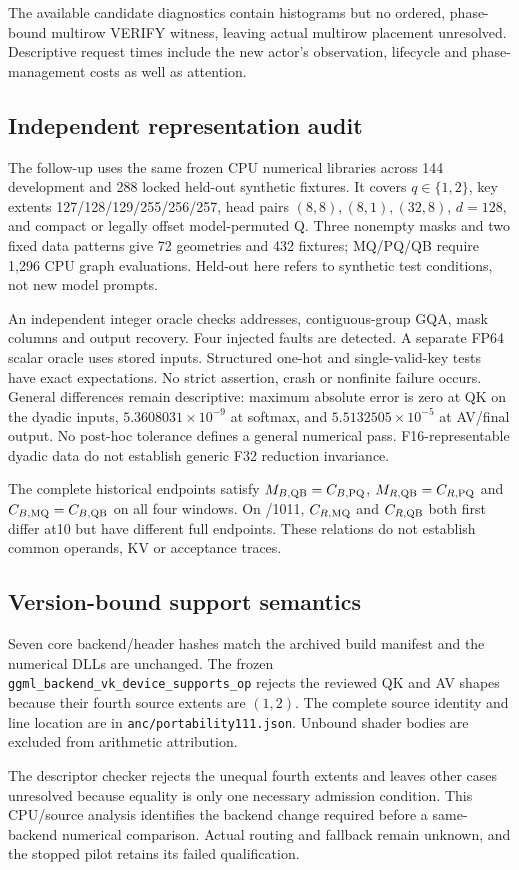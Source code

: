 The available candidate diagnostics contain histograms but no ordered, phase-bound multirow VERIFY witness, leaving actual multirow placement unresolved. Descriptive request times include the new actor's observation, lifecycle and phase-management costs as well as attention.

\subsection{Independent representation audit}
The follow-up uses the same frozen CPU numerical libraries across 144 development and 288 locked held-out synthetic fixtures. It covers $q\in\{1,2\}$, key extents 127/128/129/255/256/257, head pairs $(8,8),(8,1),(32,8)$, $d=128$, and compact or legally offset model-permuted Q. Three nonempty masks and two fixed data patterns give 72 geometries and 432 fixtures; MQ/PQ/QB require 1,296 CPU graph evaluations. Held-out here refers to synthetic test conditions, not new model prompts.

An independent integer oracle checks addresses, contiguous-group GQA, mask columns and output recovery. Four injected faults are detected. A separate FP64 scalar oracle uses stored inputs. Structured one-hot and single-valid-key tests have exact expectations. No strict assertion, crash or nonfinite failure occurs. General differences remain descriptive: maximum absolute error is zero at QK on the dyadic inputs, $5.3608031\!\times\!10^{-9}$ at softmax, and $5.5132505\!\times\!10^{-5}$ at AV/final output. No post-hoc tolerance defines a general numerical pass. F16-representable dyadic data do not establish generic F32 reduction invariance.

The complete historical endpoints satisfy $M_{B,\mathrm{QB}}=C_{B,\mathrm{PQ}}$, $M_{R,\mathrm{QB}}=C_{R,\mathrm{PQ}}$ and $C_{B,\mathrm{MQ}}=C_{B,\mathrm{QB}}$ on all four windows. On /1011, $C_{R,\mathrm{MQ}}$ and $C_{R,\mathrm{QB}}$ both first differ at10 but have different full endpoints. These relations do not establish common operands, KV or acceptance traces.

\subsection{Version-bound support semantics}
Seven core backend/header hashes match the archived build manifest and the numerical DLLs are unchanged. The frozen \texttt{ggml\_backend\_vk\_device\_supports\_op} rejects the reviewed QK and AV shapes because their fourth source extents are $(1,2)$. The complete source identity and line location are in \texttt{anc/portability111.json}. Unbound shader bodies are excluded from arithmetic attribution.

The descriptor checker rejects the unequal fourth extents and leaves other cases unresolved because equality is only one necessary admission condition. This CPU/source analysis identifies the backend change required before a same-backend numerical comparison. Actual routing and fallback remain unknown, and the stopped pilot retains its failed qualification.

